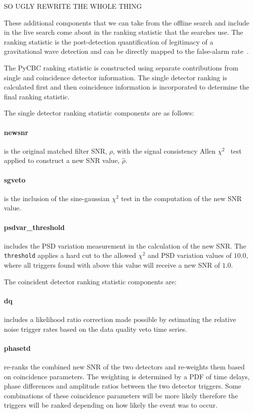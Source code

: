 SO UGLY REWRITE THE WHOLE THING

These additional components that we can take from the offline search and include in the live search come about in the ranking statistic that the searches use. The ranking statistic is the post-detection quantification of legitimacy of a gravitational wave detection and can be directly mapped to the false-alarm rate~\cite{PyCBC_global:2020}.

The PyCBC ranking statistic is constructed using separate contributions from single and coincidence detector information. The single detector ranking is calculated first and then coincidence information is incorporated to determine the final ranking statistic. 

The single detector ranking statistic components are as follows:
\paragraph{newsnr}

is the original matched filter SNR, $\rho$, with the signal consistency Allen $\chi^{2}$~\cite{Allen_Chi:2005} test applied to construct a new SNR value, $\hat{\rho}$.

\paragraph{sgveto}

is the inclusion of the sine-gaussian $\chi^{2}$ test in the computation of the new SNR value.

\paragraph{psdvar\_threshold}

includes the PSD variation measurement in the calculation of the new SNR. The \verb|threshold| applies a hard cut to the allowed $\chi^{2}$ and PSD variation values of $10.0$, where all triggers found with above this value will receive a new SNR of $1.0$.

The coincident detector ranking statistic components are:
\paragraph{dq}
includes a likelihood ratio correction made possible by estimating the relative noise trigger rates based on the data quality veto time series.

\paragraph{phasetd}
re-ranks the combined new SNR of the two detectors and re-weights them based on coincidence parameters. The weighting is determined by a PDF of time delays, phase differences and amplitude ratios between the two detector triggers. Some combinations of these coincidence parameters will be more likely therefore the triggers will be ranked depending on how likely the event was to occur.

